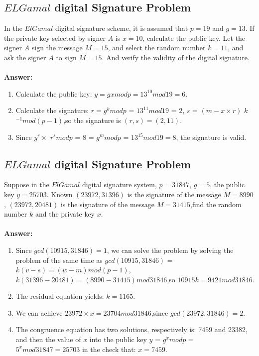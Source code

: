 \documentclass[paper=a4, fontsize=11pt]{scrartcl} %
\numberwithin{equation}{section} %
\numberwithin{figure}{section} %
\numberwithin{table}{section} %
\begin{document}
\subsection{$ELGamal$ digital Signature Problem \uppercase\expandafter{}}


In the $ElGamal$ digital signature scheme, it is assumed that $p = 19$ and $g = 13$. If the private key selected by signer $A$ is $x = 10$, calculate the public key. Let the signer $A$ sign the message $M = 15$, and select the random number $k = 11$, and ask the signer $A$ to sign $M = 15$. And verify the validity of the digital signature.
\\
\\
\textbf{Answer:}
\begin{enumerate}
\item Calculate the public key: $y = gx mod p = 13^10 mod 19 = 6$.
\item Calculate the signature: $r=g^k mod p$ = $13^11mod 19$ = $2$, $s$ = $(m-x \times r)$ $k$$^{-1} mod (p-1)$,so the signature is $(r,s)=(2, 11)$.
\item Since $y ^ r \times $ $r^s mod p$ = 8 = $g^m mod p$ = $13$$^{15} mod 19 = 8$, the signature is valid.
\end{enumerate}


\subsection{$ELGamal$ digital Signature Problem \uppercase\expandafter{}}

Suppose in the $ElGamal$ digital signature system, $p = 31847$, $g = 5$, the public key $y = 25703$. Known $(23972,31396)$ is the signature of the message $M=8990$, $(23972,20481)$ is the signature of the message $M = 31415$,find the random number $k$ and the private key $x$.
\\
\\
\textbf{Answer:}
\begin{enumerate}
\item Since $gcd (10915, 31846) = 1$, we can solve the problem by solving the problem of the same time  as $gcd (10915, 31846)$ =$ k (v-s) = (w-m) mod (p-1)$,$k (31396-20481) = (8990-31415) mod 31846$,so $10915k = 9421 mod 31846$.
\item The residual equation yields: $k = 1165$.
\item We can achieve $23972 \times x = 23704 mod 31846$,since $gcd (23972, 31846) = 2$.
\item The congruence equation has two solutions, respectively is: $7459$ and $23382$, and then the value of $x$ into the public key $y$ = $g^x mod p$ = $5^x mod 31847 = 25703$ in the check that: $x = 7459$.
\end{enumerate}
\end{document}

